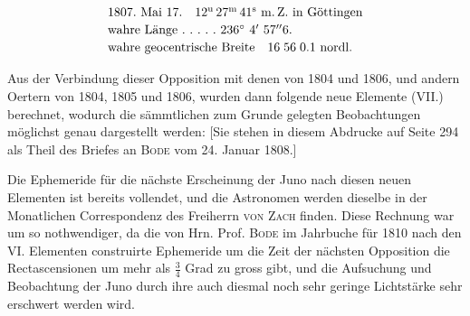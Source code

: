 \[
\begin{array}{l}
1807.\ \text{Mai}\ 17.\quad 12^{\text{u}}\,27^{\text{m}}\,41^{\text{s}}\ \text{m.\,Z. in Göttingen}\\[2pt]
\text{wahre Länge}\ .\ .\ .\ .\ .\ 236^\circ\ 4'\ 57''6.\\[2pt]
\text{wahre geocentrische Breite}\quad 16\;56\;0.1\ \text{nordl.}
\end{array}
\]\par\indent Aus der Verbindung dieser Opposition mit denen von 1804 und 1806, und andern Oertern von 1804,
1805 und 1806, wurden dann folgende neue Elemente (VII.) berechnet, wodurch die sämmtlichen
zum Grunde gelegten Beobachtungen möglichst genau dargestellt werden: [Sie stehen in diesem
Abdrucke auf Seite 294 als Theil des Briefes an \textsc{Bode} vom 24. Januar 1808.]\par\indent Die Ephemeride für die nächste Erscheinung der Juno nach diesen neuen Elementen ist bereits
vollendet, und die Astronomen werden dieselbe in der Monatlichen Correspondenz des Freiherrn
\textsc{von Zach} finden. Diese Rechnung war um so nothwendiger, da die von Hrn. Prof. \textsc{Bode} im Jahrbuche
für 1810 nach den VI. Elementen construirte Ephemeride um die Zeit der nächsten Opposition die
Rectascensionen um mehr als $\frac{3}{4}$ Grad zu gross gibt, und die Aufsuchung und
Beobachtung der Juno durch ihre auch diesmal noch sehr geringe Lichtstärke sehr erschwert
werden wird.
